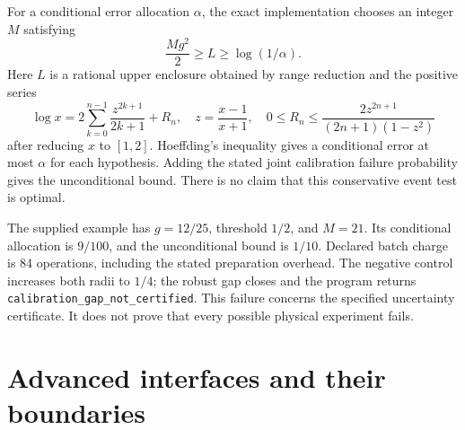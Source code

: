 For a conditional error allocation $\alpha$, the exact implementation
chooses an integer $M$ satisfying
\[
 \frac{Mg^2}{2}\ge L\ge\log(1/\alpha).
\]
Here $L$ is a rational upper enclosure obtained by range reduction and the
positive series
\[
 \log x=2\sum_{k=0}^{n-1}\frac{z^{2k+1}}{2k+1}+R_n,
 \quad z=\frac{x-1}{x+1},\quad
 0\le R_n\le\frac{2z^{2n+1}}{(2n+1)(1-z^2)}
\]
after reducing $x$ to $[1,2]$. Hoeffding's inequality gives a conditional
error at most $\alpha$ for each hypothesis. Adding the stated joint
calibration failure probability gives the unconditional bound. There is no
claim that this conservative event test is optimal.

The supplied example has $g=12/25$, threshold $1/2$, and $M=21$. Its
conditional allocation is $9/100$, and the unconditional bound is
$1/10$. Declared batch charge is 84 operations, including the stated
preparation overhead. The negative control increases both radii to $1/4$;
the robust gap closes and the program returns
\texttt{calibration\_gap\_not\_certified}. This failure concerns the
specified uncertainty certificate. It does not prove that every possible
physical experiment fails.

\section{Advanced interfaces and their boundaries}

